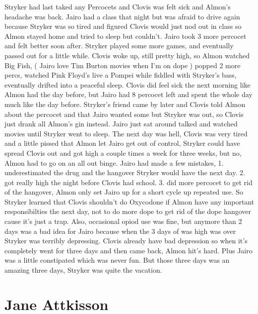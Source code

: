 \documentclass[12pt]{book}
\begin{document}
Stryker had last taked any Percocets and Clovis was felt sick and Almon's headache was back. Jairo had a class that night but was afraid to drive again because Stryker was so tired and figured Clovis would just nod out in class so Almon stayed home and tried to sleep but couldn't. Jairo took 3 more percocet and felt better soon after. Stryker played some more games, and eventually passed out for a little while. Clovis woke up, still pretty high, so Almon watched Big Fish, ( Jairo love Tim Burton movies when I'm on dope ) popped 2 more percs, watched Pink Floyd's live a Pompei while fiddled with Stryker's bass, eventually drifted into a peaceful sleep. Clovis did feel sick the next morning like Almon had the day before, but Jairo had 8 percocet left and spent the whole day much like the day before. Stryker's friend came by later and Clovis told Almon about the percocet and that Jairo wanted some but Stryker was out, so Clovis just drank all Almon's gin instead. Jairo just sat around talked and watched movies until Stryker went to sleep. The next day was hell, Clovis was very tired and a little pissed that Almon let Jairo get out of control, Stryker could have spread Clovis out and got high a couple times a week for three weeks, but no, Almon had to go on an all out binge. Jairo had made a few mistakes, 1. underestimated the drug and the hangover Stryker would have the next day. 2. got really high the night before Clovis had school. 3. did more percocet to get rid of the hangover, Almon only set Jairo up for a short cycle up repeated use. So Stryker learned that Clovis shouldn't do Oxycodone if Almon have any important responsibilties the next day, not to do more dope to get rid of the dope hangover cause it's just a trap. Also, occasional opiod use was fine, but anymore than 2 days was a bad idea for Jairo because when the 3 days of was high was over Stryker was terribly depressing. Clovis already have bad depression so when it's completely went for three days and then came back, Almon hit's hard. Plus Jairo was a little constipated which was never fun. But those three days was an amazing three days, Stryker was quite the vacation.



\chapter{Jane Attkisson}
\end{document}
